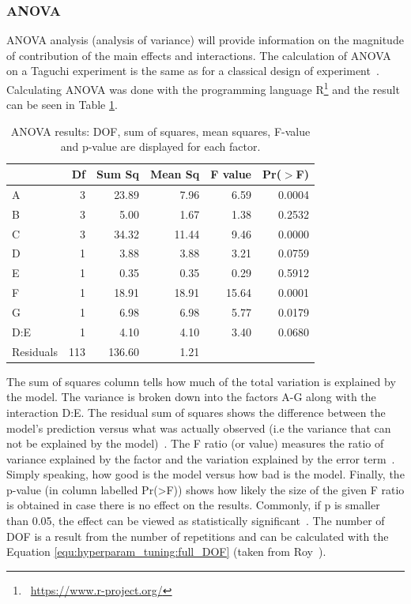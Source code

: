 \subsubsection{ANOVA}
ANOVA analysis (analysis of variance) will provide information on the magnitude of contribution of the main effects and interactions. The calculation of ANOVA on a Taguchi experiment is the same as for a classical design of experiment~\cite{yang_design_2009}. Calculating ANOVA was done with the programming language R\footnote{~\href{https://www.r-project.org/}{https://www.r-project.org/}} and the result can be seen in Table \ref{tab:taguchi:anova_results}.

\begin{table}[ht]
	\centering
	\begin{tabular}{lrrrrr}
		\hline
		& Df & Sum Sq & Mean Sq & F value & Pr($>$F) \\ 
		\hline
		A & 3 & 23.89 & 7.96 & 6.59 & 0.0004 \\ 
		B & 3 & 5.00 & 1.67 & 1.38 & 0.2532 \\ 
		C & 3 & 34.32 & 11.44 & 9.46 & 0.0000 \\ 
		D & 1 & 3.88 & 3.88 & 3.21 & 0.0759 \\ 
		E & 1 & 0.35 & 0.35 & 0.29 & 0.5912 \\ 
		F & 1 & 18.91 & 18.91 & 15.64 & 0.0001 \\ 
		G & 1 & 6.98 & 6.98 & 5.77 & 0.0179 \\ 
		D:E & 1 & 4.10 & 4.10 & 3.40 & 0.0680 \\ 
		Residuals & 113 & 136.60 & 1.21 &  &  \\ 
		\hline
	\end{tabular}
	\caption{ANOVA results: DOF, sum of squares, mean squares, F-value and p-value are displayed for each factor.}
	\label{tab:taguchi:anova_results}
\end{table}

The sum of squares column tells how much of the total variation is explained by the model. The variance is broken down into the factors A-G along with the interaction D:E. The residual sum of squares shows the difference between the model's prediction versus what was actually observed (i.e the variance that can not be explained by the model)~\cite{field_discovering_2012}. The F ratio (or value) measures the ratio of variance explained by the factor and the variation explained by the error term~\cite{field_discovering_2012}. Simply speaking, how good is the model versus how bad is the model. Finally, the p-value (in column labelled Pr(>F)) shows how likely the size of the given F ratio is obtained in case there is no effect on the results. Commonly, if p is smaller than 0.05, the effect can be viewed as statistically significant~\cite{field_discovering_2012}. The number of DOF is a result from the number of repetitions and can be calculated with the Equation \ref{equ:hyperparam_tuning:full_DOF} (taken from Roy~\cite{roy_primer_1990}).

